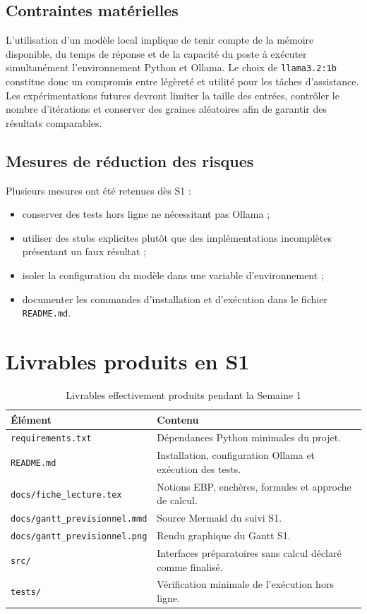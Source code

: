 \documentclass[11pt,a4paper]{article}
\begin{document}
\subsection{Contraintes matérielles}

L'utilisation d'un modèle local implique de tenir compte de la mémoire
disponible, du temps de réponse et de la capacité du poste à exécuter
simultanément l'environnement Python et Ollama. Le choix de
\texttt{llama3.2:1b} constitue donc un compromis entre légèreté et utilité
pour les tâches d'assistance. Les expérimentations futures devront limiter
la taille des entrées, contrôler le nombre d'itérations et conserver des
graines aléatoires afin de garantir des résultats comparables.

\subsection{Mesures de réduction des risques}

Plusieurs mesures ont été retenues dès S1 :

\begin{itemize}
    \item conserver des tests hors ligne ne nécessitant pas Ollama ;
    \item utiliser des stubs explicites plutôt que des implémentations
    incomplètes présentant un faux résultat ;
    \item isoler la configuration du modèle dans une variable d'environnement ;
    \item documenter les commandes d'installation et d'exécution dans le
    fichier \texttt{README.md}.
\end{itemize}

\section{Livrables produits en S1}

\begin{table}[htbp]
\centering
\caption{Livrables effectivement produits pendant la Semaine 1}
\begin{tabular}{p{}p{}}
\toprule
\textbf{Élément} & \textbf{Contenu} \\
\midrule
\texttt{requirements.txt} & Dépendances Python minimales du projet. \\
\texttt{README.md} & Installation, configuration Ollama et exécution des tests. \\
\texttt{docs/fiche\_lecture.tex} & Notions EBP, enchères, formules et approche de calcul. \\
\texttt{docs/gantt\_previsionnel.mmd} & Source Mermaid du suivi S1. \\
\texttt{docs/gantt\_previsionnel.png} & Rendu graphique du Gantt S1. \\
\texttt{src/} & Interfaces préparatoires sans calcul déclaré comme finalisé. \\
\texttt{tests/} & Vérification minimale de l'exécution hors ligne. \\
\bottomrule
\end{tabular}
\end{table}
\end{document}
